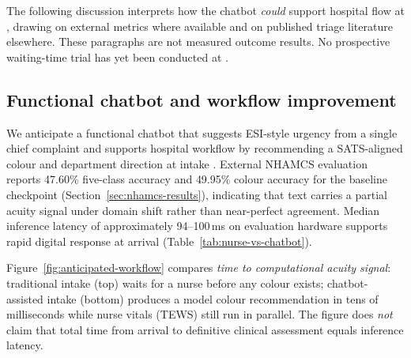 The following discussion interprets how the chatbot \emph{could} support hospital flow at \examplehospital{}, drawing on external metrics where available and on published triage literature elsewhere. These paragraphs are not measured outcome results. No prospective waiting-time trial has yet been conducted at \examplehospital{} \citep{Mitchell2023}.

\subsection{Functional chatbot and workflow improvement}

We anticipate a functional chatbot that suggests ESI-style urgency from a single chief complaint and supports hospital workflow by recommending a SATS-aligned colour and department direction at intake \citep{stewart2023nlp,Mitchell2023}. External NHAMCS evaluation reports 47.60\% five-class accuracy and 49.95\% colour accuracy for the baseline checkpoint (Section~\ref{sec:nhamcs-results}), indicating that text carries a partial acuity signal under domain shift rather than near-perfect agreement. Median inference latency of approximately 94--100\,ms on evaluation hardware supports rapid digital response at arrival (Table~\ref{tab:nurse-vs-chatbot}).

Figure~\ref{fig:anticipated-workflow} compares \emph{time to computational acuity signal}: traditional intake (top) waits for a nurse before any colour exists; chatbot-assisted intake (bottom) produces a model colour recommendation in tens of milliseconds while nurse vitals (TEWS) still run in parallel. The figure does \emph{not} claim that total time from arrival to definitive clinical assessment equals inference latency.

